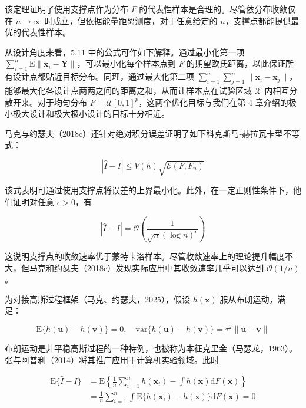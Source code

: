 \documentclass{ctexart}
\begin{document}
该定理证明了使用支撑点作为分布 $F$ 的代表性样本是合理的。尽管依分布收敛仅在 $n\to\infty$ 时成立，但依据能量距离测度，对于任意给定的 $n$，支撑点都能提供最优的代表性样本。

从设计角度来看，5.11 中的公式可作如下解释。通过最小化第一项 $\sum_{i=1}^{n}\mathrm{E}\|\boldsymbol{x}_i-\boldsymbol{Y}\|$，可以最小化每个样本点到 $F$ 的期望欧氏距离，以此保证所有设计点都贴近目标分布。同理，通过最大化第二项 $\sum_{i=1}^{n}\sum_{j=1}^{n}\|\boldsymbol{x}_i-\boldsymbol{x}_j\|$，能够最大化各设计点两两之间的距离之和，从而让样本点在试验区域 $\mathcal{X}$ 内相互分散开来。对于均匀分布 $F=\mathcal{U}[0,1]^p$，这两个优化目标与我们在第 4 章介绍的极小极大设计和极大极小设计的目标十分相近。

马克与约瑟夫（2018c）还针对绝对积分误差证明了如下科克斯马‑赫拉瓦卡型不等式：

\begin{equation*}
|\widehat{I}-I|\le V(h)\sqrt{\mathcal{E}(F,F_n)}
\end{equation*}

该式表明可通过使用支撑点将误差的上界最小化。此外，在一定正则性条件下，他们证明对任意 $\epsilon>0$，有

\begin{equation*}
|\widehat{I}-I|=\mathcal{O}\left(\frac{1}{\sqrt{n}(\log n)^\epsilon}\right)
\end{equation*}

这说明支撑点的收敛速率优于蒙特卡洛样本。尽管收敛速率上的理论提升幅度不大，但马克和约瑟夫（2018c）发现实际应用中其收敛速率几乎可以达到 $\mathcal{O}(1/n)$。

为对接高斯过程框架（马克、约瑟夫，2025），假设 $h(\boldsymbol{x})$ 服从布朗运动，满足：

\begin{equation*}
\mathrm{E}\{h(\boldsymbol{u})-h(\boldsymbol{v})\}=0,\quad \mathrm{var}\{h(\boldsymbol{u})-h(\boldsymbol{v})\}=\tau^2\|\boldsymbol{u}-\boldsymbol{v}\|
\tag{5.12}
\end{equation*}

布朗运动是非平稳高斯过程的一种特例，也被称为本征克里金（马瑟龙，1963）。张与阿普利（2014）将其推广应用于计算机实验领域。此时

\begin{align*}
\mathrm{E}\{\widehat{I}-I\}&=\mathrm{E}\left\{\frac{1}{n}\sum_{i=1}^n h(\boldsymbol{x}_i)-\int h(\boldsymbol{x})\mathrm{d}F(\boldsymbol{x})\right\}\\
&=\frac{1}{n}\sum_{i=1}^n\int \mathrm{E}\{h(\boldsymbol{x}_i)-h(\boldsymbol{x})\}\mathrm{d}F(\boldsymbol{x})=0
\end{align*}
\end{document}
